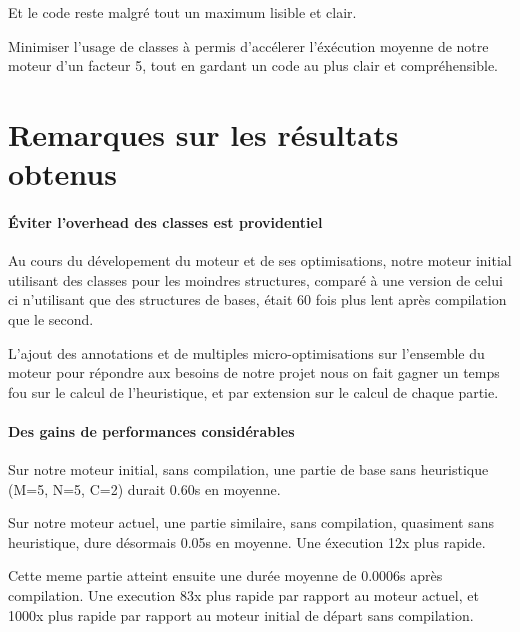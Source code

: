 		Et le code reste malgré tout un maximum lisible et clair.
	
		\begin{result}
			Minimiser l'usage de classes à permis d'accélerer l'éxécution moyenne de notre moteur d'un facteur 5, tout en gardant un code au plus clair et compréhensible.
		\end{result}
		
	\section{Remarques sur les résultats obtenus}
	
		\paragraph{Éviter l'overhead des classes est providentiel}
		Au cours du dévelopement du moteur et de ses optimisations, notre moteur initial utilisant des classes pour les moindres structures, comparé à une version de celui ci n'utilisant que des structures de bases, était 60 fois plus lent après compilation que le second. 
		
		L'ajout des annotations et de multiples micro-optimisations sur l'ensemble du moteur pour répondre aux besoins de notre projet nous on fait gagner un temps fou sur le calcul de l'heuristique, et par extension sur le calcul de chaque partie.
		
		\paragraph{Des gains de performances considérables}
		Sur notre moteur initial, sans compilation, une partie de base sans heuristique (M=5, N=5, C=2) durait 0.60s en moyenne.
		
		Sur notre moteur actuel, une partie similaire, sans compilation, quasiment sans heuristique, dure désormais 0.05s en moyenne. 
		Une éxecution 12x plus rapide.
		
		
		
		\begin{result}
		Cette meme partie atteint ensuite une durée moyenne de 0.0006s après compilation. Une execution 83x plus rapide par rapport au moteur actuel, et 1000x plus rapide par rapport au moteur initial de départ sans compilation.
		\end{result}

